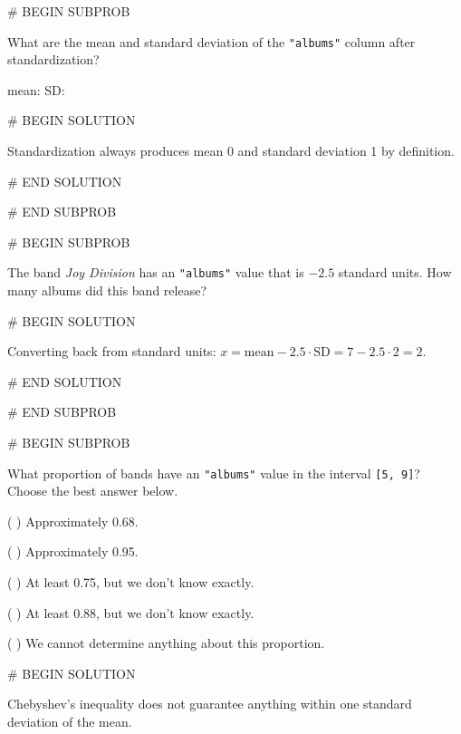\documentclass[twoside,12pt]{article}
\begin{document}
{# BEGIN SUBPROB


What are the mean and standard deviation of the \texttt{"albums"} column after standardization?

\smallskip
\begin{center}
    mean:  \qquad
    SD: 
\end{center}

# BEGIN SOLUTION


Standardization always produces mean 0 and standard deviation 1 by definition.


# END SOLUTION



# END SUBPROB

\bigskip

# BEGIN SUBPROB


The band \textit{Joy Division} has an \texttt{"albums"} value that is $-2.5$ standard units. How many albums did this band release?

\smallskip
\begin{center}
\end{center}

# BEGIN SOLUTION


Converting back from standard units: $x = \text{mean} - 2.5 \cdot \text{SD} = 7 - 2.5 \cdot 2 = 2$.


# END SOLUTION



# END SUBPROB

\bigskip

# BEGIN SUBPROB


What proportion of bands have an \texttt{"albums"} value in the interval \texttt{[5, 9]}? Choose the best answer below.

\medskip

( ) Approximately 0.68.

\smallskip

( ) Approximately 0.95.

\smallskip

( ) At least 0.75, but we don't know exactly.

\smallskip

( ) At least 0.88, but we don't know exactly.

\smallskip

( ) We cannot determine anything about this proportion.

# BEGIN SOLUTION


Chebyshev's inequality does not guarantee anything within one standard deviation of the mean.


}
\end{document}
